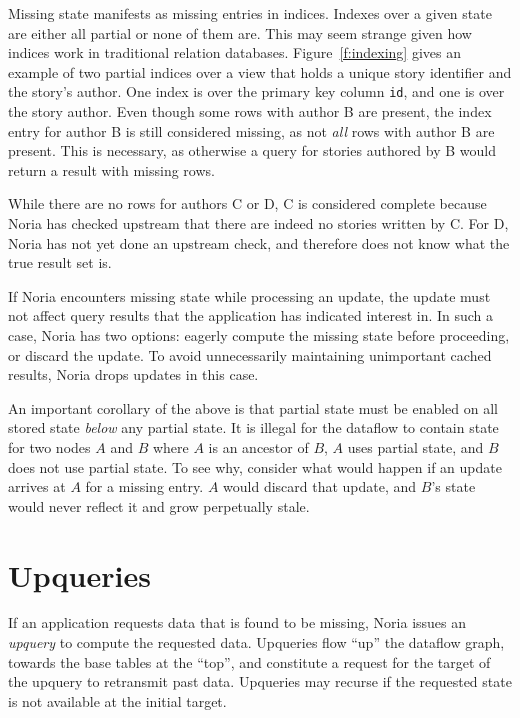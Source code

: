 Missing state manifests as missing entries in indices. Indexes over a given
state are either all partial or none of them are. This may seem strange given
how indices work in traditional relation databases. Figure~\vref{f:indexing}
gives an example of two partial indices over a view that holds a unique story
identifier and the story's author. One index is over the primary key column
\texttt{id}, and one is over the story author. Even though some rows with author
B are present, the index entry for author B is still considered missing, as not
\emph{all} rows with author B are present. This is necessary, as otherwise a
query for stories authored by B would return a result with missing rows.

While there are no rows for authors C or D, C is considered complete because
Noria has checked upstream that there are indeed no stories written by C. For D,
Noria has not yet done an upstream check, and therefore does not know what the
true result set is.

If Noria encounters missing state while processing an update, the update must
not affect query results that the application has indicated interest in. In such
a case, Noria has two options: eagerly compute the missing state before
proceeding, or discard the update. To avoid unnecessarily maintaining
unimportant cached results, Noria drops updates in this case.

An important corollary of the above is that partial state must be enabled
on all stored state \emph{below} any partial state. It is illegal for the
dataflow to contain state for two nodes $A$ and $B$ where $A$ is an ancestor of
$B$, $A$ uses partial state, and $B$ does not use partial state. To see why,
consider what would happen if an update arrives at $A$ for a missing entry. $A$
would discard that update, and $B$'s state would never reflect it and grow
perpetually stale.

\section{Upqueries}
\label{s:upqueries}

If an application requests data that is found to be missing, Noria issues an
\textit{upquery} to compute the requested data. Upqueries flow ``up'' the
dataflow graph, towards the base tables at the ``top'', and constitute a request
for the target of the upquery to retransmit past data. Upqueries may recurse if
the requested state is not available at the initial target.

